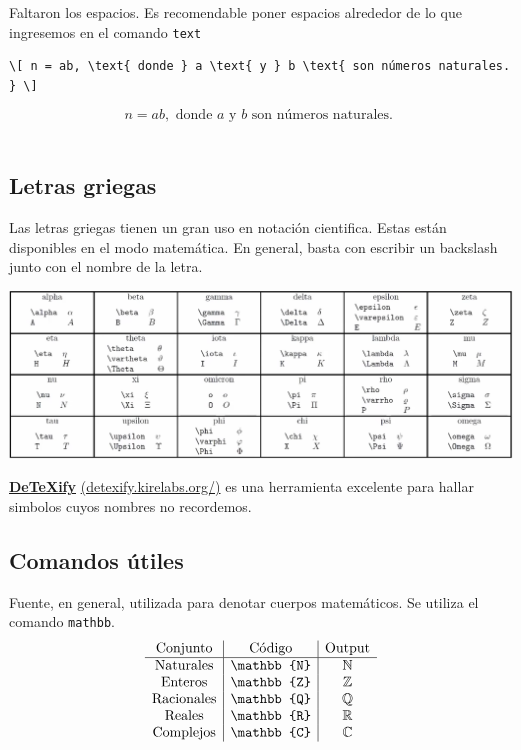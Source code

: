 \documentclass[../notes.tex]{subfiles}
\begin{document}
    Faltaron los espacios. Es recomendable poner espacios alrededor de lo que ingresemos en el comando \texttt{text}
        {\footnotesize{
            \begin{verbatim}
\[ n = ab, \text{ donde } a \text{ y } b \text{ son números naturales. } \]
            \end{verbatim}
        }}
        \[ n = ab, \text{ donde } a \text{ y } b \text{ son números naturales. } \]\\[\baselineskip]
    
    \subsection{Letras griegas}

        Las letras griegas tienen un gran uso en notación cientifica. Estas están disponibles en el modo matemática. En general, basta con escribir un backslash junto con el nombre de la letra. 
        \begin{center}
            \includegraphics[scale=0.23]{greek_letters}
        \end{center}
        
            \href{https://detexify.kirelabs.org/classify.html}{\textbf{DeTeXify}} \href{https://detexify.kirelabs.org/classify.html}{(detexify.kirelabs.org/)} es una herramienta excelente para hallar simbolos cuyos nombres no recordemos.
        
    
    \subsection{Comandos útiles}
    
        Fuente, en general, utilizada para denotar cuerpos matemáticos. Se utiliza el comando \texttt{mathbb}.
            \[ 
                \begin{array}{c|c|c}
                	\text{Conjunto} & \text{Código} & \text{Output}\\
                	\hline
                	\text{Naturales} & \text{\texttt{\textbackslash mathbb \{N\}}} & \mathbb{N}\\
                	\text{Enteros} & \text{\texttt{\textbackslash mathbb \{Z\}}} & \mathbb{Z}\\
                	\text{Racionales} & \text{\texttt{\textbackslash mathbb \{Q\}}} & \mathbb{Q}\\
                	\text{Reales} & \text{\texttt{\textbackslash mathbb \{R\}}} & \mathbb{R}\\
                	\text{Complejos} & \text{\texttt{\textbackslash mathbb \{C\}}} & \mathbb{C}
                \end{array}
            \]
    
\end{document}
